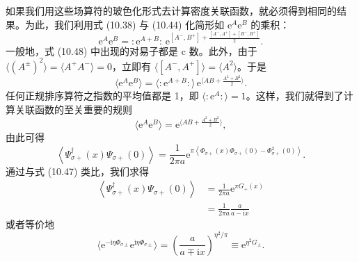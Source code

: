 如果我们用这些场算符的玻色化形式去计算密度关联函数，就必须得到相同的结果。为此，我们利用式 (10.38) 与 (10.44) 化简形如 $\mathrm{e}^{A}\mathrm{e}^{B}$ 的乘积：
\begin{equation*}
\mathrm{e}^{A}\mathrm{e}^{B}=:\mathrm{e}^{A+B}:\,\mathrm{e}^{[A^{-},B^{+}]+\frac{[A^{-},A^{+}]+[B^{-},B^{+}]}{2}}.
\tag{10.48}
\end{equation*}
一般地，式 (10.48) 中出现的对易子都是 c 数。此外，由于 $\langle(A^{\pm})^{2}\rangle=\langle A^{+}A^{-}\rangle=0$，立即有 $\langle[A^{-},A^{+}]\rangle=\langle A^{2}\rangle$。于是
\begin{equation*}
\langle\mathrm{e}^{A}\mathrm{e}^{B}\rangle=\langle:\mathrm{e}^{A+B}:\rangle\,\mathrm{e}^{\langle AB+\frac{A^{2}+B^{2}}{2}\rangle}.
\tag{10.49}
\end{equation*}
任何正规排序算符之指数的平均值都是 1，即 $\langle:\mathrm{e}^{A}:\rangle=1$。这样，我们就得到了计算关联函数的至关重要的规则
\begin{equation*}
\langle\mathrm{e}^{A}\mathrm{e}^{B}\rangle=\mathrm{e}^{\langle AB+\frac{A^{2}+B^{2}}{2}\rangle},
\tag{10.50}
\end{equation*}
由此可得
\begin{equation*}
\left\langle\Psi_{\sigma+}^{\dagger}(x)\Psi_{\sigma+}(0)\right\rangle=\frac{1}{2\pi a}\mathrm{e}^{\pi\left\langle\Phi_{\sigma+}(x)\Phi_{\sigma+}(0)-\Phi_{\sigma+}^{2}(0)\right\rangle}.
\tag{10.51}
\end{equation*}
通过与式 (10.47) 类比，我们求得
\begin{align*}
\left\langle\Psi_{\sigma+}^{\dagger}(x)\Psi_{\sigma+}(0)\right\rangle&=\frac{1}{2\pi a}\mathrm{e}^{\pi G_{+}(x)}\\
&=\frac{1}{2\pi a}\frac{a}{a-\mathrm{i}x}
\tag{10.52}
\end{align*}
或者等价地
\begin{equation*}
\langle\mathrm{e}^{-\mathrm{i}\eta\Phi_{\sigma\pm}}\mathrm{e}^{\mathrm{i}\eta\Phi_{\sigma\pm}}\rangle=\left(\frac{a}{a\mp\mathrm{i}x}\right)^{\eta^{2}/\pi}\equiv\mathrm{e}^{\eta^{2}G_{\pm}}.
\tag{10.53}
\end{equation*}

